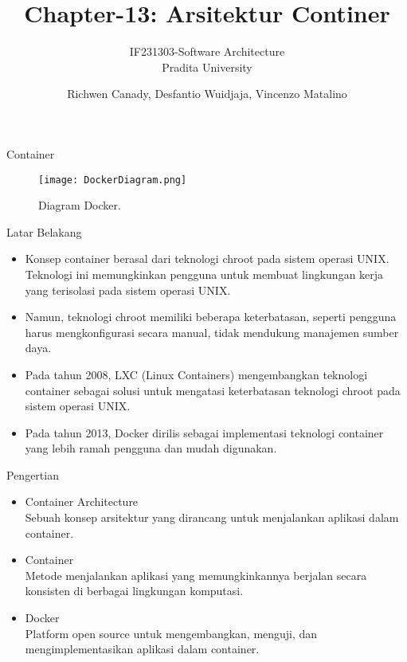 \documentclass{beamer}
\title{Chapter-13: Arsitektur Continer}
\subtitle{IF231303-Software Architecture\\Pradita University}
\author{Richwen Canady, Desfantio Wuidjaja, Vincenzo Matalino}
\begin{document}
	
	\begin{frame}[plain]
		\maketitle
	\end{frame}
	
	\begin{frame}{Container}
		\begin{figure}[h]
			\centering
			\texttt{[image: DockerDiagram.png]}
			\caption{Diagram Docker.}
			\label{fig:ContainerDiagram}
		\end{figure}
	\end{frame}
	
	\begin{frame}{Latar Belakang}
		\begin{itemize}
                \item Konsep container berasal dari teknologi chroot pada sistem operasi UNIX. Teknologi ini memungkinkan pengguna untuk membuat lingkungan kerja yang terisolasi pada sistem operasi UNIX.
                \item Namun, teknologi chroot memiliki beberapa keterbatasan, seperti pengguna harus mengkonfigurasi secara manual, tidak mendukung manajemen sumber daya.
                \item Pada tahun 2008, LXC (Linux Containers) mengembangkan teknologi container sebagai solusi untuk mengatasi keterbatasan teknologi chroot pada sistem operasi UNIX.
                \item Pada tahun 2013, Docker dirilis sebagai implementasi teknologi container yang lebih ramah pengguna dan mudah digunakan.
           \end{itemize}
		\end{frame}

        \begin{frame}{Pengertian}
		\begin{itemize}
			\item Container Architecture
                \\Sebuah konsep arsitektur yang dirancang untuk menjalankan aplikasi dalam container.
                \item Container
                \\Metode menjalankan aplikasi yang memungkinkannya berjalan secara konsisten di berbagai lingkungan komputasi.
                \item Docker
                \\Platform open source untuk mengembangkan, menguji, dan mengimplementasikan aplikasi dalam container. 
		\end{itemize}
	\end{frame}
	
\end{document}

